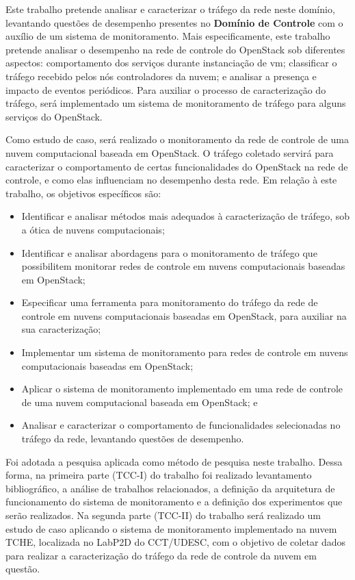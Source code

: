Este trabalho pretende analisar e caracterizar o tráfego da rede neste domínio, levantando questões de desempenho presentes no \textbf{Domínio de Controle} com o auxílio de um sistema de monitoramento.
%
Mais especificamente, este trabalho pretende analisar o desempenho na rede de controle do OpenStack sob diferentes aspectos: comportamento dos serviços durante instanciação de \ac{vm}; classificar o tráfego recebido pelos nós controladores da nuvem; e analisar a presença e impacto de eventos periódicos.
%
Para auxiliar o processo de caracterização do tráfego, será implementado um sistema de monitoramento de tráfego para alguns serviços do OpenStack.

Como estudo de caso, será realizado o monitoramento da rede de controle de uma nuvem computacional baseada em OpenStack. 
%
O tráfego coletado servirá para caracterizar o comportamento de certas funcionalidades do OpenStack na rede de controle, e como elas influenciam no desempenho desta rede.
%
Em relação à este trabalho, os objetivos específicos são:

\begin{itemize}
	\item Identificar e analisar métodos mais adequados à caracterização de tráfego, sob a ótica de nuvens computacionais;
	\item Identificar e analisar abordagens para o monitoramento de tráfego que possibilitem monitorar redes de controle em nuvens computacionais baseadas em OpenStack;
	\item Especificar uma ferramenta para monitoramento do tráfego da rede de controle em nuvens computacionais baseadas em OpenStack, para auxiliar na sua caracterização;
	\item Implementar um sistema de monitoramento para redes de controle em nuvens computacionais baseadas em OpenStack;
	\item Aplicar o sistema de monitoramento implementado em uma rede de controle de uma nuvem computacional baseada em OpenStack; e
	\item Analisar e caracterizar o comportamento de funcionalidades selecionadas no tráfego da rede, levantando questões de desempenho.
\end{itemize}

Foi adotada a pesquisa aplicada como método de pesquisa neste trabalho. 
%
Dessa forma, na primeira parte (TCC-I) do trabalho foi realizado levantamento bibliográfico, a análise de trabalhos relacionados, a definição da arquitetura de funcionamento do sistema de monitoramento e a definição dos experimentos que serão realizados.
%
Na segunda parte (TCC-II) do trabalho será realizado um estudo de caso aplicando o sistema de monitoramento implementado na nuvem TCHE, localizada no LabP2D do \mbox{CCT/UDESC}, com o objetivo de coletar dados para realizar a caracterização do tráfego da rede de controle da nuvem em questão.


